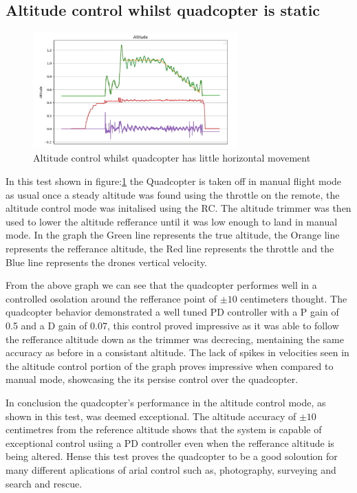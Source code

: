 \documentclass{article}
\begin{document}
\subsection*{Altitude control whilst quadcopter is static}
\begin{figure}[H]
  \centering
  \includegraphics[width=0.7\textwidth]{Pictures/Test_alitiude_control_little_movement.png}
  \caption{Altitude control whilst quadcopter has little horizontal movement}
  \label{fig:Altitude_control_no_movement}
\end{figure}
In this test shown in figure:\ref{fig:Altitude_control_no_movement} the
Quadcopter is taken off in manual flight mode as usual once a steady altitude
was found using the throttle on the remote, the altitude control mode was
initalised using the RC. The altitude trimmer was then used to lower the
altitude refferance until it was low enough to land in manual mode. In the graph
the Green line represents the true altitude, the Orange line represents the
refferance altitude, the Red line represents the throttle and the Blue line
represents the drones vertical velocity.

From the above graph we can see that the quadcopter performes well in a
controlled osolation around the refferance point of \(\pm10\) centimeters
thought. The quadcopter behavior demonstrated a well tuned PD controller with a
P gain of 0.5 and a D gain of 0.07, this control proved impressive as it was
able to follow the refferance altitude down as the trimmer was decrecing,
mentaining the same accuracy as before in a consistant altitude. The lack of
spikes in velocities seen in the altitude control portion of the graph proves
impressive when compared to manual mode, showcasing the its persise control over
the quadcopter.

In conclusion the quadcopter's performance in the altitude control mode, as
shown in this test, was deemed exceptional. The altitude accuracy of \(\pm10\)
centimetres from the reference altitude shows that the system is capable of
exceptional control usiing a PD controller even when the refferance altitude is
being altered. Hense this test proves the quadcopter to be a good soloution for
many different aplications of arial control such as, photography, surveying and
search and rescue. 
\end{document}
